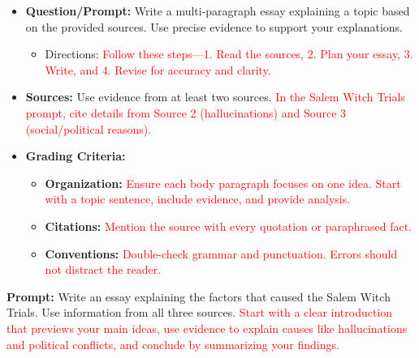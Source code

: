 \documentclass[12pt]{article}
\begin{document}
\vspace{1em}

\begin{tcolorbox}[colframe=black!60, colback=white, 
coltitle=black, colbacktitle=black!15, fonttitle=\bfseries\Large, 
title=What does the Writing Task Look Like?, halign title=center, left=10pt, right=10pt, top=10pt, bottom=15pt]
\begin{itemize}
    \item \textbf{Question/Prompt:} Write a multi-paragraph essay explaining a topic based on the provided sources. Use precise evidence to support your explanations.
    \begin{itemize}
        \item Directions: \textcolor{red}{Follow these steps—1. Read the sources, 2. Plan your essay, 3. Write, and 4. Revise for accuracy and clarity.}
    \end{itemize}
    \item \textbf{Sources:} Use evidence from at least two sources. \textcolor{red}{In the Salem Witch Trials prompt, cite details from Source 2 (hallucinations) and Source 3 (social/political reasons).}
    \item \textbf{Grading Criteria:}
    \begin{itemize}
        \item \textbf{Organization:} \textcolor{red}{Ensure each body paragraph focuses on one idea. Start with a topic sentence, include evidence, and provide analysis.}
        \item \textbf{Citations:} \textcolor{red}{Mention the source with every quotation or paraphrased fact.}
        \item \textbf{Conventions:} \textcolor{red}{Double-check grammar and punctuation. Errors should not distract the reader.}
    \end{itemize}
\end{itemize}
\end{tcolorbox}

\vspace{1em}

\begin{tcolorbox}[colframe=black!60, colback=white, 
coltitle=black, colbacktitle=black!15, fonttitle=\bfseries\Large, 
title=Example Test Prompt, halign title=center, left=10pt, right=10pt, top=10pt, bottom=15pt]
\textbf{Prompt:} Write an essay explaining the factors that caused the Salem Witch Trials. Use information from all three sources. 
\textcolor{red}{Start with a clear introduction that previews your main ideas, use evidence to explain causes like hallucinations and political conflicts, and conclude by summarizing your findings.}
\end{tcolorbox}
\end{document}
